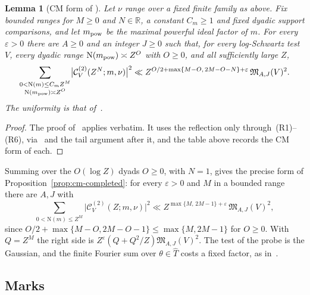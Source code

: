 \documentclass[11pt]{article}
\numberwithin{equation}{section}
\newcommand{\N}{\mathrm N}
\newtheorem{lemma}{Lemma}
\begin{document}
\begin{lemma}[CM form of {\cite[Lemma~5.8]{OAI78}}]\label{lem:s1-unmarked}
Let $\nu$ range over a fixed finite family as above. Fix bounded ranges for $M\ge0$ and $N\in\mathbb R$, a constant
$C_m\ge1$ and fixed dyadic support comparisons, and let $m_{\rm pow}$ be the maximal powerful ideal factor of $m$. For
every $\varepsilon>0$ there are $A\ge0$ and an integer $J\ge0$ such that, for every log-Schwartz test $V$, every
dyadic range $\N(m_{\rm pow})\asymp Z^O$ with $O\ge0$, and all sufficiently large $Z$,
\begin{equation}\label{eq:d137}
 \sum_{\substack{0<\N(m)\le C_mZ^M\\\N(m_{\rm pow})\asymp Z^O}}\bigl|\mathcal C^{(2)}_V(Z^N;m,\nu)\bigr|^2
 \ll Z^{O/2+\max\{M-O,\,2M-O-N\}+\varepsilon}\,\mathfrak M_{A,J}(V)^2 .
\end{equation}
The uniformity is that of~\cite[Lemma~5.8]{OAI78}.
\end{lemma}

\begin{proof}
The proof of~\cite[Lemma~5.8]{OAI78} applies verbatim. It uses the
reflection only through~(R1)--(R6), via~\cite[Lemma~5.7]{OAI78} and the tail argument after it, and the
table above records the CM form of each.
\end{proof}

Summing over the $O(\log Z)$ dyads $O\ge0$, with $N=1$, gives the precise form of
Proposition~\ref{prop:cm-completed}: for every $\varepsilon>0$ and $M$ in a bounded range there are $A,J$ with
\begin{equation}\label{eq:s1-cm-completed}
 \sum_{0<\N(m)\le Z^M}\bigl|\mathcal C^{(2)}_V(Z;m,\nu)\bigr|^2\ll Z^{\max\{M,\,2M-1\}+\varepsilon}\,
 \mathfrak M_{A,J}(V)^2 ,
\end{equation}
since $O/2+\max\{M-O,2M-O-1\}\le\max\{M,2M-1\}$ for $O\ge0$. With $Q=Z^M$ the right side is
$Z^\varepsilon(Q+Q^2/Z)\mathfrak M_{A,J}(V)^2$. The test of
the probe is the Gaussian, and the finite Fourier sum over $\theta\in\widehat T$ costs a fixed factor, as
in~\cite[Section~6.1]{OAI78}.

\subsection{Marks}\label{sec:s1-marks}
\end{document}
